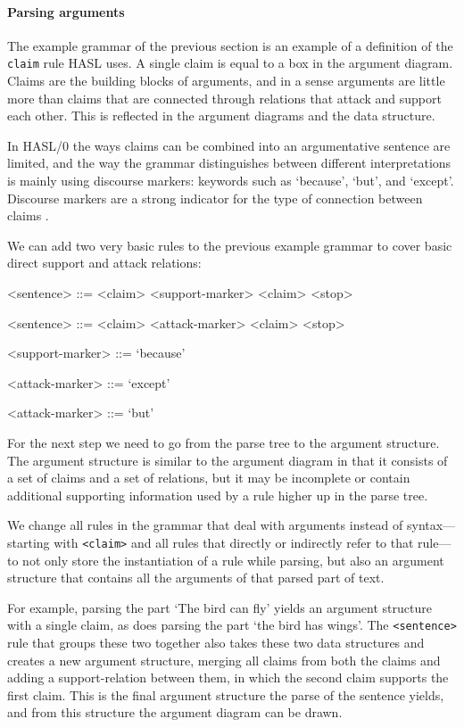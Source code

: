 \documentclass{IOS-Book-Article}
\begin{document}
\paragraph{Parsing arguments} The example grammar of the previous section is an example of a definition of the \texttt{claim} rule HASL uses. A single claim is equal to a box in the argument diagram. Claims are the building blocks of arguments, and in a sense arguments are little more than claims that are connected through relations that attack and support each other. This is reflected in the argument diagrams and the data structure.

In HASL/0 the ways claims can be combined into an argumentative sentence are limited, and the way the grammar distinguishes between different interpretations is mainly using discourse markers: keywords such as `because', `but', and `except'. Discourse markers are a strong indicator for the type of connection between claims \cite{lawrenceReed2015}.

We can add two very basic rules to the previous example grammar to cover basic direct support and attack relations:

\begin{grammar}

<sentence> ::= <claim> <support-marker> <claim> <stop>

<sentence> ::= <claim> <attack-marker> <claim> <stop>

<support-marker> ::= `because'

<attack-marker> ::= `except'

<attack-marker> ::= `but'

\end{grammar}

For the next step we need to go from the parse tree to the argument structure. The argument structure is similar to the argument diagram in that it consists of a set of claims and a set of relations, but it may be incomplete or contain additional supporting information used by a rule higher up in the parse tree.

We change all rules in the grammar that deal with arguments instead of syntax---starting with \texttt{<claim>} and all rules that directly or indirectly refer to that rule---to not only store the instantiation of a rule while parsing, but also an argument structure that contains all the arguments of that parsed part of text.

For example, parsing the part `The bird can fly' yields an argument structure with a single claim, as does parsing the part `the bird has wings'. The \texttt{<sentence>} rule that groups these two together also takes these two data structures and creates a new argument structure, merging all claims from both the claims and adding a support-relation between them, in which the second claim supports the first claim. This is the final argument structure the parse of the sentence yields, and from this structure the argument diagram can be drawn.
\end{document}
